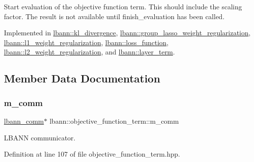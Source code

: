 Start evaluation of the objective function term. This should include the scaling factor. The result is not available until finish\+\_\+evaluation has been called. 

Implemented in \hyperlink{classlbann_1_1kl__divergence_a0a77c724ff9b918e2c2eaf3944f50ac5}{lbann\+::kl\+\_\+divergence}, \hyperlink{classlbann_1_1group__lasso__weight__regularization_a5cc5fd80eed7f2b9d881c48edc6d49d0}{lbann\+::group\+\_\+lasso\+\_\+weight\+\_\+regularization}, \hyperlink{classlbann_1_1l1__weight__regularization_ace2c0fe490dd1e630460063b6df23597}{lbann\+::l1\+\_\+weight\+\_\+regularization}, \hyperlink{classlbann_1_1loss__function_a90f4126b0b4d47838ef3cc154c6d9705}{lbann\+::loss\+\_\+function}, \hyperlink{classlbann_1_1l2__weight__regularization_ab3a47d8ef5b8c8e16f076659e864f683}{lbann\+::l2\+\_\+weight\+\_\+regularization}, and \hyperlink{classlbann_1_1layer__term_ae2ab6b694701db724345573416ce0427}{lbann\+::layer\+\_\+term}.



\subsection{Member Data Documentation}
\mbox{\label{classlbann_1_1objective__function__term_a591367c1f2eac887c0f7426335265345}} 
\subsubsection{\texorpdfstring{m\+\_\+comm}{m\_comm}}
{\footnotesize\ttfamily \hyperlink{classlbann_1_1lbann__comm}{lbann\+\_\+comm}$\ast$ lbann\+::objective\+\_\+function\+\_\+term\+::m\+\_\+comm\hspace{0.3cm}{\ttfamily [private]}}

L\+B\+A\+NN communicator. 

Definition at line 107 of file objective\+\_\+function\+\_\+term.\+hpp.

\mbox{\label{classlbann_1_1objective__function__term_a9269cf0a237eacd1e220ba2739f44334}} 
